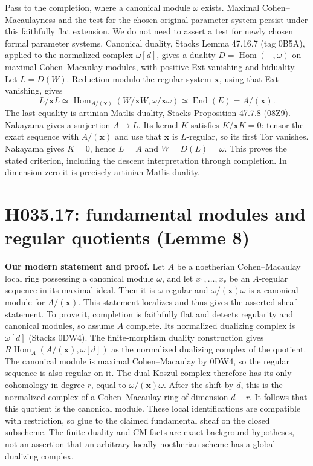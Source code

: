 Pass to the completion, where a canonical module $\omega$ exists.
Maximal Cohen--Macaulayness and the test for the chosen original
parameter system persist under this faithfully flat extension. We do
not need to assert a test for newly chosen formal parameter systems.
Canonical duality, Stacks Lemma 47.16.7 (tag 0B5A), applied to the
normalized complex $\omega[d]$, gives a duality
$D=\operatorname{Hom}(-,\omega)$ on maximal Cohen--Macaulay modules,
with positive Ext vanishing and biduality. Let $L=D(W)$. Reduction
modulo the regular system $\mathbf x$, using that Ext vanishing, gives
\[
 L/\mathbf xL\simeq
 \operatorname{Hom}_{A/(\mathbf x)}(W/\mathbf xW,
                                      \omega/\mathbf x\omega)
 \simeq\operatorname{End}(E)=A/(\mathbf x).
\]
The last equality is artinian Matlis duality, Stacks Proposition 47.7.8
(08Z9). Nakayama gives a surjection $A\to L$. Its kernel $K$ satisfies
$K/\mathbf xK=0$: tensor the exact sequence with $A/(\mathbf x)$ and
use that $\mathbf x$ is $L$-regular, so its first Tor vanishes.
Nakayama gives $K=0$, hence $L=A$ and $W=D(L)=\omega$. This proves
the stated criterion, including the descent interpretation through
completion. In dimension zero it is precisely artinian Matlis duality.

\section{H035.17: fundamental modules and regular quotients (Lemme 8)}
\textbf{Our modern statement and proof.} Let $A$ be a noetherian
Cohen--Macaulay local ring possessing a canonical module $\omega$,
and let $x_1,\ldots,x_r$ be an $A$-regular sequence in its maximal
ideal. Then it is $\omega$-regular and
$\omega/(\mathbf x)\omega$ is a canonical module for
$A/(\mathbf x)$. This statement localizes and thus gives the asserted
sheaf statement. To prove it, completion is faithfully flat and detects
regularity and canonical modules, so assume $A$ complete. Its normalized
dualizing complex is $\omega[d]$ (Stacks 0DW4). The finite-morphism
duality construction gives
$R\operatorname{Hom}_A(A/(\mathbf x),\omega[d])$ as the normalized
dualizing complex of the quotient. The canonical module is maximal
Cohen--Macaulay by 0DW4, so the regular sequence is also regular on it.
The dual Koszul complex therefore has its only cohomology in degree $r$,
equal to $\omega/(\mathbf x)\omega$. After the shift by $d$, this is
the normalized complex of a Cohen--Macaulay ring of dimension $d-r$.
It follows that this quotient is the canonical module. These local
identifications are compatible with restriction, so glue to the claimed
fundamental sheaf on the closed subscheme. The finite duality and CM
facts are exact background hypotheses, not an assertion that an arbitrary
locally noetherian scheme has a global dualizing complex.


